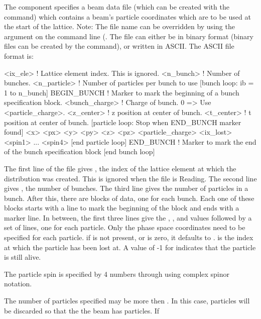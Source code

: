 {{{{{{{{{{{{{The  component specifies a beam data file (which can be
created with the  command) which
contains a beam's particle coordinates which are to be used at the
start of the lattice.  Note: The file name can be overridden by using
the  argument on the command line
(. The file can either be in binary format
(binary files can be created by the  command), or
written in ASCII. The ASCII file format is:
\begin{example}
  <ix_ele>         ! Lattice element index. This is ignored.
  <n_bunch>        ! Number of bunches.
  <n_particle>     ! Number of particles per bunch to use
  [bunch loop: ib = 1 to n_bunch]
    BEGIN_BUNCH    ! Marker to mark the beginning of a bunch specification block.
    <bunch_charge> ! Charge of bunch. 0 => Use <particle_charge>.
    <z_center>     ! z position at center of bunch.
    <t_center>     ! t position at center of bunch.
    [particle loop: Stop when END_BUNCH marker found]
      <x> <px> <y> <py> <z> <pz> <particle_charge> <ix_lost> <spin1> ... <spin4>
    [end particle loop]
    END_BUNCH      ! Marker to mark the end of the bunch specification block
  [end bunch loop]
\end{example}
The first line of the file gives , the index of the lattice
element at which the distribution was created. This is ignored when
the file is Reading. The second line gives , the number
of bunches. The third line gives  the number of
particles in a bunch. After this, there are  blocks of
data, one for each bunch. Each one of these blocks starts with a
 line to mark the beginning of the block and ends with
a  marker line. In between, the first three lines give
the , , and  values followed by a set of
lines, one for each particle. Only the phase space coordinates need to
be specified for each particle. if  is not
present, or is zero, it defaults to .
 is the index at which the particle has been lost at. A
value of -1 for  indicates that the particle is still
alive.

The particle spin is specified by 4 numbers  through
 using complex spinor notation.

The number of particles specified may be more then
. In this case, particles will be discarded so that
the the beam has  particles. If
\vn{beam_init%
override the setting of \vn{<n_particle>} in the beam file.

}}}}}}}}}}}}}}
